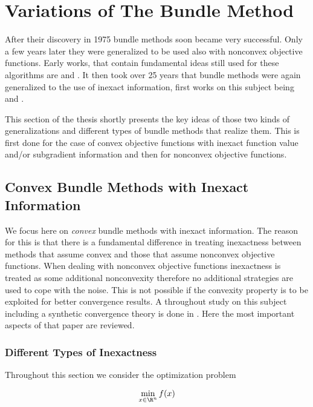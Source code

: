 \section{Variations of The Bundle Method}
\label{sec_simplifications}

After their discovery in 1975 bundle methods soon became very successful. Only a few years later they were generalized to be used also with nonconvex objective functions. Early works, that contain fundamental ideas still used for these algorithms are \cite{Mifflin1982} and \cite{Kiwiel1985}.
It then took over 25 years that bundle methods were again generalized to the use of inexact information, first works on this subject being \cite{Hintermueller2001,Kiwiel2006} and \cite{Solodov2003}.

This section of the thesis shortly presents the key ideas of those two kinds of generalizations and different types of bundle methods that realize them.
This is first done for the case of convex objective functions with inexact function value and/or subgradient information and then for nonconvex objective functions. 

\subsection{Convex Bundle Methods with Inexact Information}

We focus here on \emph{convex} bundle methods with inexact information. The reason for this is that there is a fundamental difference in treating inexactness between methods that assume convex and those that assume nonconvex objective functions.
When dealing with nonconvex objective functions inexactness is treated as some additional nonconvexity therefore no additional strategies are used to cope with the noise. This is not possible if the convexity property is to be exploited for better convergence results.
A throughout study on this subject including a synthetic convergence theory is done in \cite{Oliveira2014}. Here the most important aspects %
of that paper are reviewed.

\subsubsection{Different Types of Inexactness}

Throughout this section we consider the optimization problem

\begin{equation}
	\min_{x \in \R^n} f(x)
\label{opt_prob_conv}
\end{equation}

